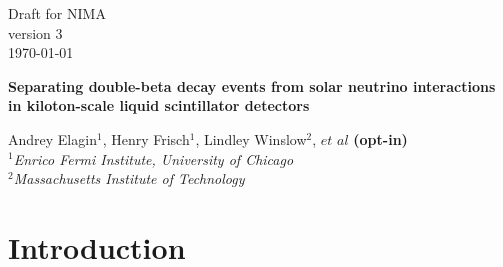 \documentclass[12pt,twoside,letterpaper]{article}
\newcommand{\vbb}{0\nu\beta\beta}
\newcommand{\B}{^{8}B}
\begin{document}
\vspace*{-3.5cm}
\begin{flushright}
Draft for NIMA\\
version 3\\
\today
\end{flushright}



\begin{center}
  \begin{Large}
  {\bf Separating double-beta decay events from solar neutrino interactions in kiloton-scale liquid scintillator detectors}
  \end{Large}
\end{center}


\begin{center}
Andrey Elagin$^1$, Henry Frisch$^1$, Lindley Winslow$^2$, $et$ $al$ {\bf (opt-in)}\\
\emph{$^1$Enrico Fermi Institute, University of Chicago\\ 
$^2$Massachusetts Institute of Technology}
\end{center}



\begin{abstract}
We propose a technique for separating $\vbb$-decay events from background due to $\B$ solar neutrino interactions in a liquid scintillator detector. The technique compares event topology of the signal and background events using spherical harmonics analysis of the early light emitted in $\vbb$-decay and $\B$ events. Selection of early photons using fast photo-detectors allows for separation of directional Cherenkov from isotropic scintillation light and identification of two event topologies based on the spatial distribution of the early photons in the detector.
\end{abstract}

\newpage
\tableofcontents
\newpage





\section{Introduction}
\end{document}
